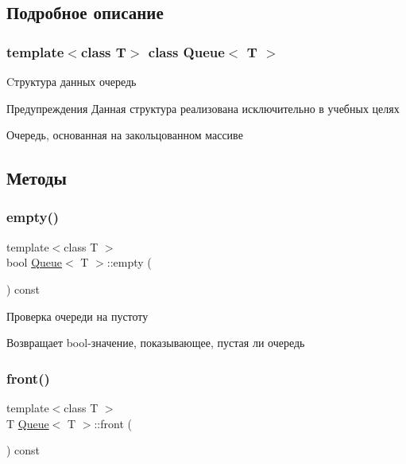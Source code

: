 \subsection{Подробное описание}
\subsubsection*{template$<$class T$>$\newline
class Queue$<$ T $>$}

Cтруктура данных очередь 

\begin{DoxyWarning}{Предупреждения}
Данная структура реализована исключительно в учебных целях
\end{DoxyWarning}
Очередь, основанная на закольцованном массиве 

\subsection{Методы}
\mbox{\label{classQueue_a84af2287bc5dad708508b588dc73457d}} 
\subsubsection{\texorpdfstring{empty()}{empty()}}
{\footnotesize\ttfamily template$<$class T $>$ \\
bool \hyperlink{classQueue}{Queue}$<$ T $>$\+::empty (\begin{DoxyParamCaption}{ }\end{DoxyParamCaption}) const\hspace{0.3cm}{\ttfamily [inline]}}



Проверка очереди на пустоту 

\begin{DoxyReturn}{Возвращает}
bool-\/значение, показывающее, пустая ли очередь 
\end{DoxyReturn}
\mbox{\label{classQueue_a8554e7c5797d5a73fc2c4854a2d57b99}} 
\subsubsection{\texorpdfstring{front()}{front()}}
{\footnotesize\ttfamily template$<$class T $>$ \\
T \hyperlink{classQueue}{Queue}$<$ T $>$\+::front (\begin{DoxyParamCaption}{ }\end{DoxyParamCaption}) const\hspace{0.3cm}{\ttfamily [inline]}}



